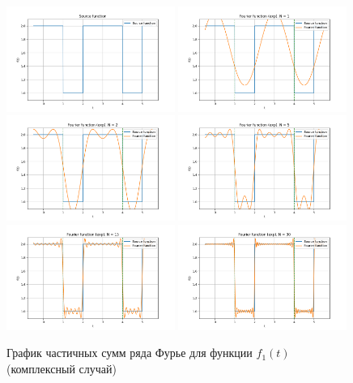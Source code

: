\begin{figure}[ht!]
    \centering
    \includegraphics[width=0.49\textwidth]{media/plots/func_1_exp.png}
    \includegraphics[width=0.49\textwidth]{media/plots/func_1_exp_N_1.png}
    \includegraphics[width=0.49\textwidth]{media/plots/func_1_exp_N_2.png}
    \includegraphics[width=0.49\textwidth]{media/plots/func_1_exp_N_5.png}
    \includegraphics[width=0.49\textwidth]{media/plots/func_1_exp_N_15.png}
    \includegraphics[width=0.49\textwidth]{media/plots/func_1_exp_N_30.png}
    \caption{График частичных сумм ряда Фурье для функции $f_1(t)$ (комплексный случай)}
    \label{fig:func_1_plot_exp}
\end{figure}

